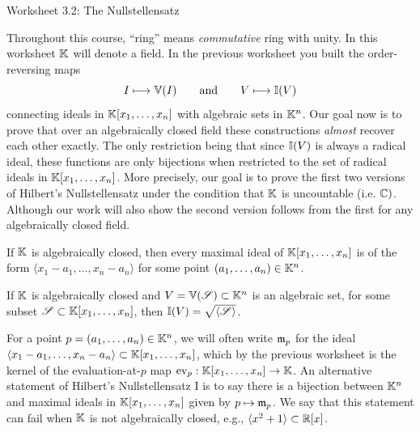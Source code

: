 \documentclass[Notebook.tex]{subfiles}
\begin{document}
\ifSubfilesClassLoaded{}{}

\begin{center}
    {Worksheet 3.2: The Nullstellensatz}
\end{center}


Throughout this course, ``ring'' means \textit{commutative} ring with unity. In this worksheet $\mathbb K$ will denote a field. In the previous worksheet you built the order-reversing maps
\[
I \longmapsto \mathbb V(I)
\qquad\text{and}\qquad
V \longmapsto \mathbb I(V)
\]
connecting ideals in $\mathbb K[x_1,\ldots,x_n]$ with algebraic sets in $\mathbb K^n$. Our goal now is to prove that over an algebraically closed field these constructions \emph{almost} recover each other exactly. The only restriction being that since $\mathbb I(V)$ is always a radical ideal, these functions are only bijections when restricted to the set of radical ideals in $\mathbb K[x_1,\ldots,x_n]$. More precisely, our goal is to prove the first two versions of  Hilbert's Nullstellensatz under the condition that $\mathbb K$ is uncountable (i.e. $\mathbb C)$. Although our work will also show the second version follows from the first for any algebraically closed field. 

\begin{theorem} If $\mathbb K$ is algebraically closed, then every maximal ideal of $\mathbb K[x_1,\ldots,x_n]$ is of the form $\langle x_1-a_1,\ldots,x_n-a_n\rangle$ for some point $(a_1,\ldots,a_n) \in \mathbb K^n$.
\end{theorem}  

 \begin{theorem} If $\mathbb K$ is algebraically closed and $V = \mathbb V(\operatorname{\mathscr S}) \subset \mathbb K^n$ is an algebraic set, for some subset $\operatorname{\mathscr S} \subset \mathbb K[x_1,\ldots,x_n]$, then $\mathbb I(V) = \sqrt{\langle \operatorname{\mathscr S} \rangle}$. 
\end{theorem}  

For a point $p=(a_1,\ldots,a_n)\in \mathbb K^n$, we will often write $\operatorname{\mathfrak{m}}_p$ for the ideal $\langle x_1-a_1,\ldots,x_n-a_n\rangle \subset \mathbb K[x_1,\ldots,x_n]$, which by the previous worksheet is the kernel of the evaluation-at-$p$ map $\operatorname{ev}_{p}:\mathbb K[x_1,\ldots,x_{n}] \to \mathbb K$.  An alternative statement of Hilbert's Nullstellensatz I is to say there is a bijection between $\mathbb K^n$ and maximal ideals in $\mathbb K[x_1,\ldots,x_n]$ given by $p\mapsto \operatorname{\mathfrak{m}}_p$. We say that this statement can fail when $\mathbb K$ is not algebraically closed, e.g., $\langle x^2+1 \rangle \subset \mathbb R[x]$. 
\end{document}
